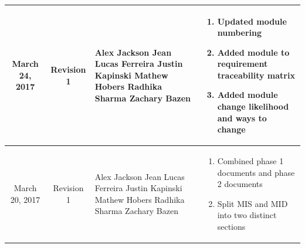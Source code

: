\documentclass [10pt]{article}
\begin{document}
\begin{longtable}{| p{ } | p{ } | p{ } | p{ } |}
\multicolumn{1}{|c|}{\multirow{1}{*}{\centering March 24, 2017}}  & 
\multicolumn{1}{c|}{\multirow{1}{*}{Revision 1}} &
\begin{minipage}{.21\columnwidth}
\vspace{1mm}
    Alex Jackson \newline
    Jean Lucas Ferreira \newline
    Justin Kapinski\newline
    Mathew Hobers\newline
    Radhika Sharma\newline
    Zachary Bazen     \vspace{1mm}
\end{minipage}&
\begin{minipage} {.27\columnwidth}
    \begin{enumerate}[label = - , leftmargin=0.11in]
        \itemsep -.5em
        \item Updated module numbering
        \item Added module to requirement traceability matrix
        \item Added module change likelihood and ways to change \vspace{1mm}
    \end{enumerate}
\end{minipage}\\ \hline 

\multicolumn{1}{|c|}{\multirow{1}{*}{\centering March 20, 2017}}  & 
\multicolumn{1}{c|}{\multirow{1}{*}{Revision 1}} &
\begin{minipage}{.21\columnwidth}
\vspace{1mm}
    Alex Jackson \newline
    Jean Lucas Ferreira \newline
    Justin Kapinski\newline
    Mathew Hobers\newline
    Radhika Sharma\newline
    Zachary Bazen     \vspace{1mm}
\end{minipage}&
\begin{minipage} {.27\columnwidth}
    \begin{enumerate}[label = - , leftmargin=0.11in]
        \itemsep -.5em
        \item Combined phase 1 documents and phase 2 documents
        \item Split MIS and MID into two distinct sections\vspace{1mm}
    \end{enumerate}
\end{minipage}\\ \hline 



\end{longtable}
\end{document}
